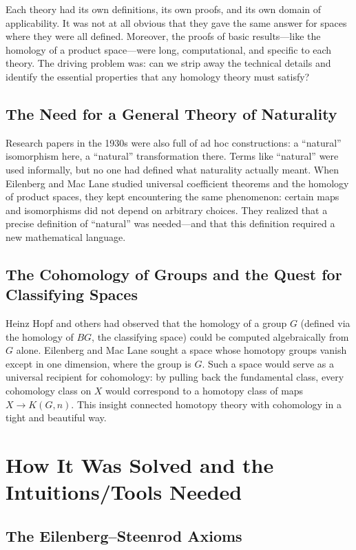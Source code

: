 Each theory had its own definitions, its own proofs, and its own domain of applicability. It was not at all obvious that they gave the same answer for spaces where they were all defined. Moreover, the proofs of basic results---like the homology of a product space---were long, computational, and specific to each theory. The driving problem was: can we strip away the technical details and identify the essential properties that any homology theory must satisfy?

\subsection{The Need for a General Theory of Naturality}

Research papers in the 1930s were also full of ad hoc constructions: a ``natural'' isomorphism here, a ``natural'' transformation there. Terms like ``natural'' were used informally, but no one had defined what naturality actually meant. When Eilenberg and Mac Lane studied universal coefficient theorems and the homology of product spaces, they kept encountering the same phenomenon: certain maps and isomorphisms did not depend on arbitrary choices. They realized that a precise definition of ``natural'' was needed---and that this definition required a new mathematical language.

\subsection{The Cohomology of Groups and the Quest for Classifying Spaces}

Heinz Hopf and others had observed that the homology of a group $G$ (defined via the homology of $BG$, the classifying space) could be computed algebraically from $G$ alone. Eilenberg and Mac Lane sought a space whose homotopy groups vanish except in one dimension, where the group is $G$. Such a space would serve as a universal recipient for cohomology: by pulling back the fundamental class, every cohomology class on $X$ would correspond to a homotopy class of maps $X \to K(G,n)$. This insight connected homotopy theory with cohomology in a tight and beautiful way.

\section{How It Was Solved and the Intuitions/Tools Needed}

\subsection{The Eilenberg--Steenrod Axioms}

